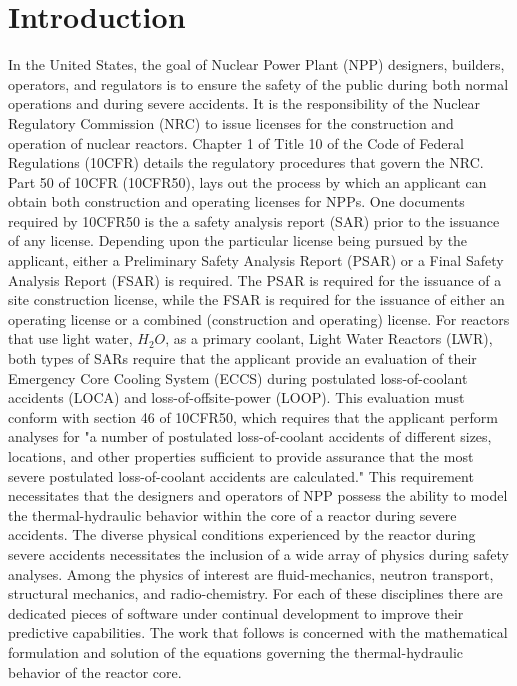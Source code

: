 \chapter{Introduction}
\label{chap:intro}
In the United States, the goal of Nuclear Power Plant (NPP) designers, builders, operators, and regulators is to ensure the safety of the public during both normal operations and during severe accidents.
It is the responsibility of the Nuclear Regulatory Commission (NRC) to issue licenses for the construction and operation of nuclear reactors.
Chapter 1 of Title 10 of the Code of Federal Regulations (10CFR) details the regulatory procedures that govern the NRC.
Part 50 of 10CFR (10CFR50), lays out the process by which an applicant can obtain both construction and operating licenses for NPPs.
One documents required by 10CFR50 is the a safety analysis report (SAR) prior to the issuance of any license.
Depending upon the particular license being pursued by the applicant, either a Preliminary Safety Analysis Report (PSAR) or a Final Safety Analysis Report (FSAR) is required.
The PSAR is required for the issuance of a site construction license, while the FSAR is required for the issuance of either an operating license or a combined (construction and operating) license.
For reactors that use light water, $H_2 O$, as a primary coolant, Light Water Reactors (LWR), both types of SARs require that the applicant provide an evaluation of their Emergency Core Cooling System (ECCS) during postulated loss-of-coolant accidents (LOCA) and loss-of-offsite-power (LOOP).
This evaluation must conform with section 46 of 10CFR50, which requires that the applicant perform analyses for "a number of postulated loss-of-coolant accidents of different sizes, locations, and other properties sufficient to provide assurance that the most severe postulated loss-of-coolant accidents are calculated."
This requirement necessitates that the designers and operators of NPP possess the ability to model the thermal-hydraulic behavior within the core of a reactor during severe accidents.  
The diverse physical conditions experienced by the reactor during severe accidents necessitates the inclusion of a wide array of physics during safety analyses.
Among the physics of interest are fluid-mechanics, neutron transport, structural mechanics, and radio-chemistry.
For each of these disciplines there are dedicated pieces of software under continual development to improve their predictive capabilities.
The work that follows is concerned with the mathematical formulation and solution of the equations governing the thermal-hydraulic behavior of the reactor core.

